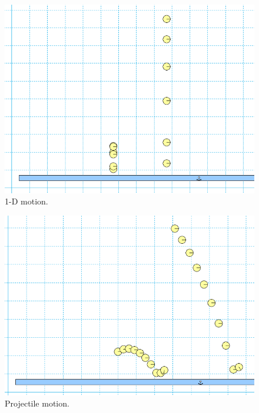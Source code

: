 \documentclass[12pt]{article}
\begin{document}
%
\begin{figure}[!h]
\centering
\includegraphics[scale=0.35]{figures/fig2.png}
\caption{1-D motion.}
\label{fig:fig2}
\end{figure}
%
\begin{figure}[!h]
\centering
\includegraphics[scale=0.35]{figures/fig3.png}
\caption{Projectile motion.}
\label{fig:fig3}
\end{figure}
\end{document}
